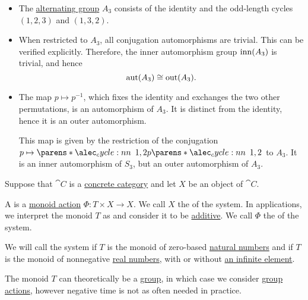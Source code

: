 \begin{example}
\begin{itemize}
    \item The \hyperref[def:alternating_group]{alternating group} \( A_3 \) consists of the identity and the odd-length cycles \( (1, 2, 3) \) and \( (1, 3, 2) \).

    \item When restricted to \( A_3 \), all conjugation automorphisms are trivial. This can be verified explicitly. Therefore, the inner automorphism group \( \operatorname{inn}(A_3) \) is trivial, and hence
    \begin{equation*}
      \operatorname{aut}(A_3) \cong \operatorname{out}(A_3).
    \end{equation*}

    \item The map \( p \mapsto p^{-1} \), which fixes the identity and exchanges the two other permutations, is an automorphism of \( A_3 \). It is distinct from the identity, hence it is an outer automorphism.

    This map is given by the restriction of the conjugation \( p \mapsto \cycle{1, 2} p \cycle{1, 2} \) to \( A_3 \). It is an inner automorphism of \( S_3 \), but an outer automorphism of \( A_3 \).
  \end{itemize}
\end{example}

\begin{definition}\label{def:dynamical_system}\mimprovised
  Suppose that \( \cat{C} \) is a \hyperref[def:concrete_category]{concrete category} and let \( X \) be an object of \( \cat{C} \).

  A  is a \hyperref[def:monoid_action]{monoid action} \( \Phi: T \times X \to X \). We call \( X \) the  of the system. In applications, we interpret the monoid \( T \) as  and consider it to be \hyperref[rem:additive_magma]{additive}. We call \( \Phi \) the  of the system.

  We will call the system  if \( T \) is the monoid of zero-based \hyperref[def:set_of_natural_numbers]{natural numbers} and  if \( T \) is the monoid of nonnegative \hyperref[def:set_of_real_numbers]{real numbers}, with or without \hyperref[def:extended_real_numbers]{an infinite element}.

  The monoid \( T \) can theoretically be a \hyperref[def:group]{group}, in which case we consider \hyperref[def:group_action]{group actions}, however negative time is not as often needed in practice.
\end{definition}

